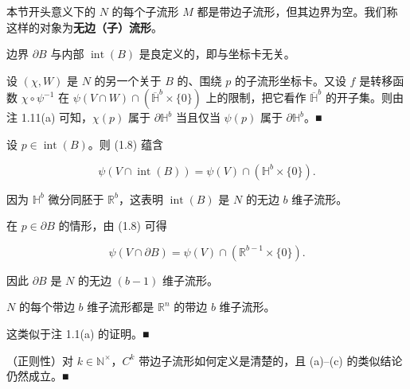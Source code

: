 \begin{remark}

\begin{items}
\item

本节开头意义下的 $ N $ 的每个子流形 $ M $ 都是带边子流形，但其边界为空。我们称这样的对象为\textbf{无边（子）流形}。

\item

边界 $ \partial B $ 与内部 $ \operatorname{int}(B) $ 是良定义的，即与坐标卡无关。

\proofhead
设 $ (\chi,W) $ 是 $ N $ 的另一个关于 $ B $ 的、围绕 $ p $ 的子流形坐标卡。又设 $ f $ 是转移函数 $ \chi\circ\psi^{-1} $ 在 $ \psi(V\cap W)\cap(\overline{\mathbb{H}}^b\times\{0\}) $ 上的限制，把它看作 $ \overline{\mathbb{H}}^b $ 的开子集。则由注 1.11(a) 可知，$ \chi(p) $ 属于 $ \partial\mathbb{H}^b $ 当且仅当 $ \psi(p) $ 属于 $ \partial\mathbb{H}^b $。\nobreak\hspace{0.35em}■
\item

设 $ p \in \operatorname{int}(B) $。则 (1.8) 蕴含

\[
\psi(V\cap\operatorname{int}(B)) = \psi(V)\cap(\mathbb{H}^b\times\{0\}) .
\]

因为 $ \mathbb{H}^b $ 微分同胚于 $ \mathbb{R}^b $，这表明 $ \operatorname{int}(B) $ 是 $ N $ 的无边 $ b $ 维子流形。

\item

在 $ p \in \partial B $ 的情形，由 (1.8) 可得

\[
\psi(V\cap\partial B) = \psi(V)\cap(\mathbb{R}^{b-1}\times\{0\}) .
\]

因此 $ \partial B $ 是 $ N $ 的无边 $ (b-1) $ 维子流形。

\item

$ N $ 的每个带边 $ b $ 维子流形都是 $ \mathbb{R}^n $ 的带边 $ b $ 维子流形。

\proofhead
这类似于注 1.1(a) 的证明。\nobreak\hspace{0.35em}■
\item

（正则性）对 $ k \in \mathbb{N}^{\times} $，$ C^k $ 带边子流形如何定义是清楚的，且 (a)–(c) 的类似结论仍然成立。\nobreak\hspace{0.35em}■

\end{items}

\end{remark}

